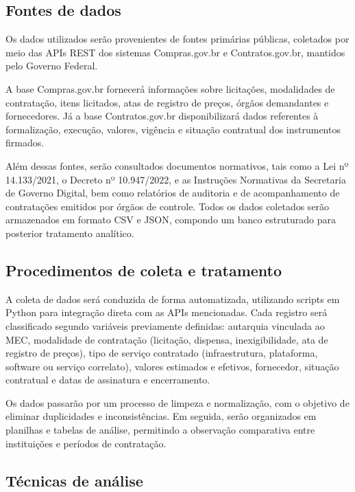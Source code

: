 \documentclass[a4paper, 12pt,brazil]{article}
\begin{document}
\subsection{Fontes de dados}

Os dados utilizados serão provenientes de fontes primárias públicas, coletados por meio das APIs REST dos sistemas Compras.gov.br e Contratos.gov.br, mantidos pelo Governo Federal.

A base Compras.gov.br fornecerá informações sobre licitações, modalidades de contratação, itens licitados, atas de registro de preços, órgãos demandantes e fornecedores. Já a base Contratos.gov.br disponibilizará dados referentes à formalização, execução, valores, vigência e situação contratual dos instrumentos firmados.

Além dessas fontes, serão consultados documentos normativos, tais como a Lei nº 14.133/2021, o Decreto nº 10.947/2022, e as Instruções Normativas da Secretaria de Governo Digital, bem como relatórios de auditoria e de acompanhamento de contratações emitidos por órgãos de controle. Todos os dados coletados serão armazenados em formato CSV e JSON, compondo um banco estruturado para posterior tratamento analítico.

\subsection{Procedimentos de coleta e tratamento}

A coleta de dados será conduzida de forma automatizada, utilizando scripts em Python para integração direta com as APIs mencionadas. Cada registro será classificado segundo variáveis previamente definidas: autarquia vinculada ao MEC, modalidade de contratação (licitação, dispensa, inexigibilidade, ata de registro de preços), tipo de serviço contratado (infraestrutura, plataforma, software ou serviço correlato), valores estimados e efetivos, fornecedor, situação contratual e datas de assinatura e encerramento.

Os dados passarão por um processo de limpeza e normalização, com o objetivo de eliminar duplicidades e inconsistências. Em seguida, serão organizados em planilhas e tabelas de análise, permitindo a observação comparativa entre instituições e períodos de contratação.

\subsection{Técnicas de análise}
\end{document}
